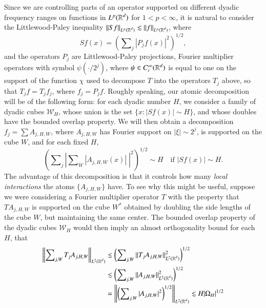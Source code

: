 Since we are controlling parts of an operator supported on different dyadic frequency ranges on functions in $L^p(\operatorname{\mathbb{R}}^d)$ for $1 < p < \infty$, it is natural to consider the Littlewood-Paley inequality $\| Sf \|_{L^p(\operatorname{\mathbb{R}}^d)} \lesssim \| f \|_{L^p(\operatorname{\mathbb{R}}^d)}$, where
%
\begin{equation}
  Sf(x) = \left( \sum\nolimits_j |P_j f(x)|^2 \right)^{1/2},
\end{equation}
%
and the operators $P_j$ are Littlewood-Paley projections, Fourier multiplier operators with symbol $\psi(\cdot / 2^j)$, where $\psi \in C_c^\infty(\operatorname{\mathbb{R}}^d)$ is equal to one on the support of the function $\chi$ used to decompose $T$ into the operators $T_j$ above, so that $T_j f = T_j f_j$, where $f_j = P_j f$. Roughly speaking, our atomic decomposition will be of the following form: for each dyadic number $H$, we consider a family of dyadic cubes $\mathcal{W}_H$, whose union is the set $\{ x : |Sf(x)| \sim H \}$, and whose doubles have the bounded overlap property. We will then obtain a decomposition $f_j = \sum A_{j,H,W}$, where $A_{j,H,W}$ has Fourier support on $|\xi| \sim 2^j$, is supported on the cube $W$, and for each fixed $H$,
%
\begin{equation}
  \left( \sum\nolimits_j \left|\sum\nolimits_W |A_{j,H,W}(x)|\; \right|^2 \right)^{1/2} \sim H \quad\text{if $|Sf(x)| \sim H$}.
\end{equation}
%
The advantage of this decomposition is that it controls how many \emph{local interactions} the atoms $\{ A_{j,H,W} \}$ have. To see why this might be useful, suppose we were considering a Fourier multiplier operator $T$ with the property that $T A_{j,H,W}$ is supported on the cube $W^*$ obtained by doubling the side lengths of the cube $W$, but maintaining the same center. The bounded overlap property of the dyadic cubes $\mathcal{W}_H$ would then imply an almost orthogonality bound for each $H$, that
%
\begin{equation}
\begin{split}
  \left\| \sum\nolimits_{j,W} T_j A_{j,H,W} \right\|_{L^2(\operatorname{\mathbb{R}}^d)} &\lesssim \left( \sum\nolimits_{j,W} \| T_j A_{j,H,W} \|_{L^2(\operatorname{\mathbb{R}}^d)}^2 \right)^{1/2}\\
  &\lesssim \left( \sum\nolimits_{j,W} \| A_{j,H,W} \|_{L^2(\operatorname{\mathbb{R}}^d)}^2 \right)^{1/2}\\
  &= \left\| \left( \sum\nolimits_{j,W} |A_{j,H,W}|^2 \right)^{1/2} \right\|_{L^2(\operatorname{\mathbb{R}}^d)} \lesssim H |\Omega_H|^{1/2}
\end{split}
\end{equation}
